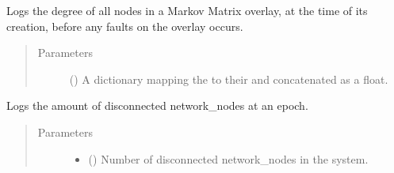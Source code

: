 \documentclass[letterpaper,10pt,english]{sphinxmanual}
\begin{document}
\begin{fulllineitems}
\begin{fulllineitems}
\label{\detokenize{app.domain.helpers:app.domain.helpers.smart_dataclasses.LoggingData.log_matrices_degrees}}
Logs the degree of all nodes in a Markov Matrix overlay, at the
time of its creation, before any faults on the overlay occurs.
\begin{quote}\begin{description}
\item[{Parameters}] \leavevmode
{} (\sphinxstyleliteralemphasis{\sphinxupquote{{[}}}\sphinxstyleliteralemphasis{\sphinxupquote{, }}\sphinxstyleliteralemphasis{\sphinxupquote{{]}}}) \textendash{} A dictionary mapping the {\hyperref[\detokenize{app.domain:app.domain.network_nodes.Node.id}]{}} to their 
and  concatenated as a float.

\end{description}\end{quote}

\end{fulllineitems}


\begin{fulllineitems}
\label{\detokenize{app.domain.helpers:app.domain.helpers.smart_dataclasses.LoggingData.log_off_nodes}}
Logs the amount of disconnected network\_nodes at an epoch.
\begin{quote}\begin{description}
\item[{Parameters}] \leavevmode\begin{itemize}
\item {} 
 () \textendash{} Number of disconnected network\_nodes in the system.


\end{itemize}
\end{description}
\end{quote}
\end{fulllineitems}
\end{fulllineitems}
\end{document}
